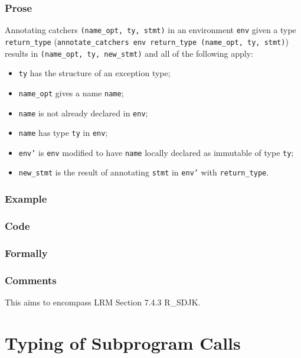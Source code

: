 \documentclass{book}
\begin{document}
  \subsection{Prose}
   Annotating catchers \texttt{(name\_opt, ty, stmt)} in an environment
\texttt{env} given a type \texttt{return\_type} (\texttt{annotate\_catchers env
return\_type (name\_opt, ty, stmt)}) results in \texttt{(name\_opt, ty,
new\_stmt)} and all of the following apply:
   \begin{itemize}
   \item \texttt{ty} has the structure of an exception type;
   \item \texttt{name\_opt} gives a name \texttt{name};
   \item \texttt{name} is not already declared in \texttt{env};
   \item \texttt{name} has type \texttt{ty} in \texttt{env};
   \item \texttt{env'} is \texttt{env} modified to have \texttt{name} locally declared as immutable of type \texttt{ty};
   \item \texttt{new\_stmt} is the result of annotating \texttt{stmt} in \texttt{env'} with \texttt{return\_type}.
   \end{itemize}

  \subsection{Example}

  \subsection{Code}

\begin{emptyformal}
    \subsection{Formally}
\end{emptyformal}

\subsection{Comments}
    This aims to encompass LRM Section 7.4.3 R\_SDJK.

\chapter{Typing of Subprogram Calls}
\end{document}
